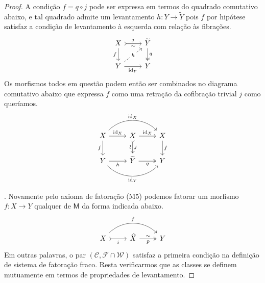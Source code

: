 \begin{proof}
  A condição $f = q \circ j$ pode ser expressa em termos do quadrado comutativo abaixo, e tal quadrado admite um levantamento $h: Y \to \widetilde{Y}$ pois $f$ por hipótese satisfaz a condição de levantamento à esquerda com relação às fibrações.
  \begin{displaymath}
    \begin{tikzcd}
      X
      \arrow[d, "f" swap]
      \arrow[r, tail, "j", "\sim" {swap}]
      & \widetilde{Y}
      \arrow[d, two heads, "q"]
      \\ Y
      \arrow[r, "\id_{Y}" swap]
      \arrow[ru, dashed, "h" description]
      & Y
    \end{tikzcd}
  \end{displaymath}
  Os morfismos todos em questão podem então ser combinados no diagrama comutativo abaixo que expressa $f$ como uma retração da cofibração trivial $j$ como queríamos.
  \begin{displaymath}
    \begin{tikzcd}
      X
      \arrow[r, "\id_{X}"]
      \arrow[rr, bend left=45, "\id_{X}"]
      \arrow[d, "f" swap]
      & X
      \arrow[d, tail, "j", "\sim" {swap, sloped}]
      \arrow[r, "\id_{X}"]
      & X
      \arrow[d, "f"]
      \\ Y
      \arrow[r, "h" swap]
      \arrow[rr, bend right=45, "\id_{Y}" swap]
      & \widetilde{Y}
      \arrow[r, two heads, "q" swap]
      & Y
    \end{tikzcd}
  \end{displaymath}

  . Novamente pelo axioma de fatoração (M5) podemos fatorar um morfismo $f: X \to Y$ qualquer de $\mathsf{M}$ da forma indicada abaixo.
  \begin{equation}
    \label{eq:fatoracao_cofib_fib_triv}
    \begin{tikzcd}
      X
      \arrow[r, tail, "i" swap]
      \arrow[rr, bend left=45, "f"]
      & \widehat{X}
      \arrow[r, two heads, "p" {swap}, "\sim"]
      & Y
    \end{tikzcd}
  \end{equation}
  Em outras palavras, o par $(\mathcal{C}, \mathcal{F} \cap \mathcal{W})$ satisfaz a primeira condição na definição de sistema de fatoração fraco.
  Resta verificarmos que as classes se definem mutuamente em termos de propriedades de levantamento.


\end{proof}

